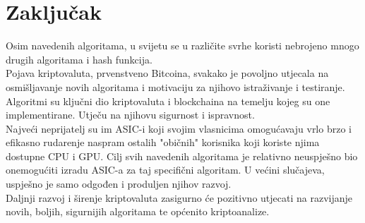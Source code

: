 \documentclass[12pt]{article}
\providecommand\phantomsection{}
\begin{document}
\section{Zaključak}
Osim navedenih algoritama, u svijetu se u različite svrhe koristi nebrojeno mnogo drugih algoritama i hash funkcija.\\
Pojava kriptovaluta, prvenstveno Bitcoina, svakako je povoljno utjecala na osmišljavanje novih algoritama i motivaciju za njihovo istraživanje i testiranje. \\
Algoritmi su ključni dio kriptovaluta i blockchaina na temelju kojeg su one implementirane. Utječu na njihovu sigurnost i ispravnost.\\
Najveći neprijatelj su im ASIC-i koji svojim vlasnicima omogućavaju vrlo brzo i efikasno rudarenje naspram ostalih "običnih" korisnika koji koriste njima dostupne CPU i GPU. Cilj svih navedenih algoritama je relativno neuspješno bio onemogućiti izradu ASIC-a za taj specifični algoritam. U većini slučajeva, uspješno je samo odgođen i produljen njihov razvoj.\\
Daljnji razvoj i širenje kriptovaluta zasigurno će pozitivno utjecati na razvijanje novih, boljih, sigurnijih algoritama te općenito kriptoanalize.


\pagebreak


\phantomsection
{}




	
\end{document}
